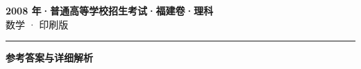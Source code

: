 \documentclass[zihao=5, a4paper]{ctexart}
\begin{document}
\begin{center}
  {\Large\bfseries 2008 年·普通高等学校招生考试·福建卷·理科}\\[4pt]
  {\large 数学 · 印刷版}
\end{center}
\medskip
{}

\par\bigskip\hrule\bigskip
{}
\begin{center}{\large\bfseries 参考答案与详细解析}\end{center}
\smallskip

\end{document}

